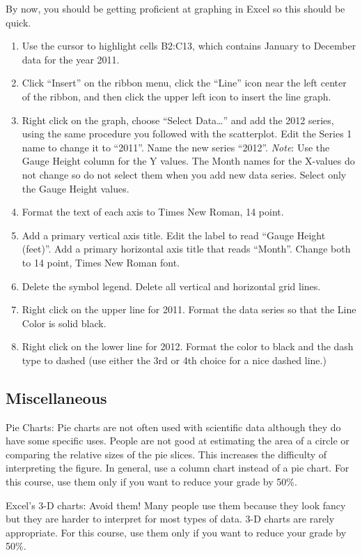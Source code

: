 \documentclass[12pt, hidelinks]{exam}
\begin{document}
By now, you should be getting proficient at graphing in Excel so this should be quick.

\begin{enumerate}
	\item Use the cursor to highlight cells B2:C13, which contains January to December data for the year 2011.

	\item Click “Insert” on the ribbon menu, click the “Line” icon near the left center of the ribbon, and then click the upper left icon to insert the line graph.

	\item Right click on the graph, choose “Select Data…” and add the 2012 series, using the same procedure you followed with the scatterplot. Edit the Series 1 name to change it to “2011”. Name the new series “2012”. \emph{Note}: Use the Gauge Height column for the Y values. The Month names for the X-values do not change so do not select them when you add new data series. Select only the Gauge Height values.

	\item Format the text of each axis to Times New Roman, 14 point.
	
	\item Add a primary vertical axis title. Edit the label to read “Gauge Height (feet)”. Add a primary horizontal axis title that reads “Month”. Change both to 14 point, Times New Roman font.

	\item Delete the symbol legend. Delete all vertical and horizontal grid lines.

	\item Right click on the upper line for 2011. Format the data series so that the Line Color is solid black.

	\item Right click on the lower line for 2012. Format the color to black and the dash type to dashed (use either the 3rd or 4th choice for a nice dashed line.)
\end{enumerate}

\subsection*{Miscellaneous}

Pie Charts: Pie charts are not often used with scientific data although they do have some specific uses. People are not good at estimating the area of a circle or comparing the relative sizes of the pie slices. This increases the difficulty of interpreting the figure. In general, use a column chart instead of a pie chart. For this course, use them only if you want to reduce your grade by 50\%.

Excel’s 3-D charts: Avoid them! Many people use them because they look fancy but they are harder to interpret for most types of data. 3-D charts are rarely appropriate. For this course, use them only if you want to reduce your grade by 50\%.
\end{document}
